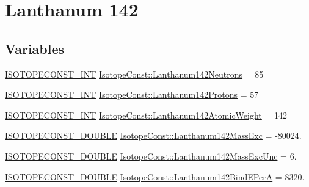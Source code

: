 \hypertarget{group___isotope_const-_lanthanum-_la142}{}\section{Lanthanum 142}
\label{group___isotope_const-_lanthanum-_la142}
\subsection*{Variables}
\begin{DoxyCompactItemize}
\item 
\mbox{\hyperlink{group___isotope_const-_macros_ga5f18360b3e99483a35c32d789e62621c}{I\+S\+O\+T\+O\+P\+E\+C\+O\+N\+S\+T\+\_\+\+I\+NT}} \mbox{\hyperlink{group___isotope_const-_lanthanum-_la142_gab1a7327cc5b1cae7738136ee4ee6a822}{Isotope\+Const\+::\+Lanthanum142\+Neutrons}} = 85
\item 
\mbox{\hyperlink{group___isotope_const-_macros_ga5f18360b3e99483a35c32d789e62621c}{I\+S\+O\+T\+O\+P\+E\+C\+O\+N\+S\+T\+\_\+\+I\+NT}} \mbox{\hyperlink{group___isotope_const-_lanthanum-_la142_ga387db8c2b97948b54e30652f736f6431}{Isotope\+Const\+::\+Lanthanum142\+Protons}} = 57
\item 
\mbox{\hyperlink{group___isotope_const-_macros_ga5f18360b3e99483a35c32d789e62621c}{I\+S\+O\+T\+O\+P\+E\+C\+O\+N\+S\+T\+\_\+\+I\+NT}} \mbox{\hyperlink{group___isotope_const-_lanthanum-_la142_gab05e800c0f8cc345970c3a7cc0f45b7e}{Isotope\+Const\+::\+Lanthanum142\+Atomic\+Weight}} = 142
\item 
\mbox{\hyperlink{group___isotope_const-_macros_ga8f45a7272ce02c0b4c65c44636ed719a}{I\+S\+O\+T\+O\+P\+E\+C\+O\+N\+S\+T\+\_\+\+D\+O\+U\+B\+LE}} \mbox{\hyperlink{group___isotope_const-_lanthanum-_la142_ga53d708dcd13c54679fbc447117a42d8f}{Isotope\+Const\+::\+Lanthanum142\+Mass\+Exc}} = -\/80024.
\item 
\mbox{\hyperlink{group___isotope_const-_macros_ga8f45a7272ce02c0b4c65c44636ed719a}{I\+S\+O\+T\+O\+P\+E\+C\+O\+N\+S\+T\+\_\+\+D\+O\+U\+B\+LE}} \mbox{\hyperlink{group___isotope_const-_lanthanum-_la142_ga38e7972897882f3784d8d0616a98225a}{Isotope\+Const\+::\+Lanthanum142\+Mass\+Exc\+Unc}} = 6.
\item 
\mbox{\hyperlink{group___isotope_const-_macros_ga8f45a7272ce02c0b4c65c44636ed719a}{I\+S\+O\+T\+O\+P\+E\+C\+O\+N\+S\+T\+\_\+\+D\+O\+U\+B\+LE}} \mbox{\hyperlink{group___isotope_const-_lanthanum-_la142_ga75215195c4631e69b6a285336af6b0d7}{Isotope\+Const\+::\+Lanthanum142\+Bind\+E\+PerA}} = 8320.
\item 

\end{DoxyCompactItemize}
